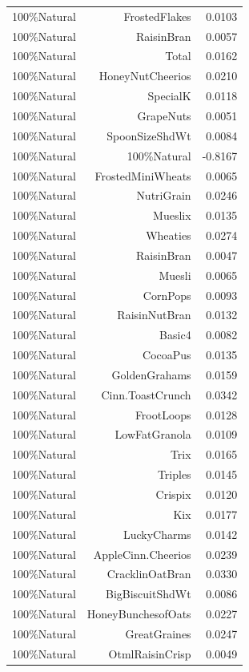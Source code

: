 \begin{longtable}{@{}lrr@{}}
100\%Natural & FrostedFlakes & 0.0103 \\
100\%Natural & RaisinBran & 0.0057 \\
100\%Natural & Total & 0.0162 \\
100\%Natural & HoneyNutCheerios & 0.0210 \\
100\%Natural & SpecialK & 0.0118 \\
100\%Natural & GrapeNuts & 0.0051 \\
100\%Natural & SpoonSizeShdWt & 0.0084 \\
100\%Natural & 100\%Natural & -0.8167 \\
100\%Natural & FrostedMiniWheats & 0.0065 \\
100\%Natural & NutriGrain & 0.0246 \\
100\%Natural & Mueslix & 0.0135 \\
100\%Natural & Wheaties & 0.0274 \\
100\%Natural & RaisinBran & 0.0047 \\
100\%Natural & Muesli & 0.0065 \\
100\%Natural & CornPops & 0.0093 \\
100\%Natural & RaisinNutBran & 0.0132 \\
100\%Natural & Basic4 & 0.0082 \\
100\%Natural & CocoaPus & 0.0135 \\
100\%Natural & GoldenGrahams & 0.0159 \\
100\%Natural & Cinn.ToastCrunch & 0.0342 \\
100\%Natural & FrootLoops & 0.0128 \\
100\%Natural & LowFatGranola & 0.0109 \\
100\%Natural & Trix & 0.0165 \\
100\%Natural & Triples & 0.0145 \\
100\%Natural & Crispix & 0.0120 \\
100\%Natural & Kix & 0.0177 \\
100\%Natural & LuckyCharms & 0.0142 \\
100\%Natural & AppleCinn.Cheerios & 0.0239 \\
100\%Natural & CracklinOatBran & 0.0330 \\
100\%Natural & BigBiscuitShdWt & 0.0086 \\
100\%Natural & HoneyBunchesofOats & 0.0227 \\
100\%Natural & GreatGraines & 0.0247 \\
100\%Natural & OtmlRaisinCrisp & 0.0049 \\

\end{longtable}
